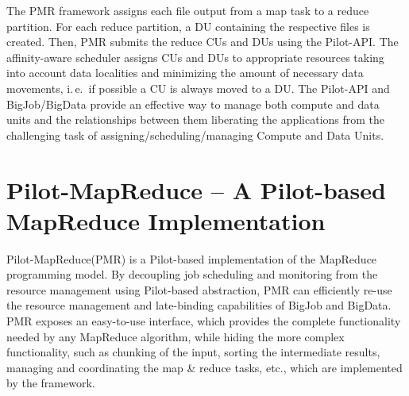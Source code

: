 \documentclass{sig-alternate}
\newcommand{\jhanote}[1]{ {\textcolor{red} { ***SJ: #1 }}}
\newcommand{\alnote}[1]{ {\textcolor{blue} { ***andreL: #1 }}}
\newcommand{\pnote}[1]{ {\textcolor{magenta} { ***pradeep: #1 }}}
\newcommand{\secrev}[1]{ {\textcolor{Bittersweet} { ***reviewer2: #1 }}}
\newcommand{\alnote}[1]{}
\newcommand{\pnote}[1]{}
\newcommand{\jhanote}[1]{}
\newcommand{\upp}{\vspace*{-0.5em}}
\newcommand{\pilot}{Pilot\xspace}
\newcommand{\pilotmapreduce}{Pilot-MapReduce\xspace}
\newcommand{\dataunits}{Data Units\xspace}
\begin{document}
The PMR framework assigns each file output from a map task to a reduce
partition. For each reduce partition, a DU containing the respective
files is created. Then, PMR submits the reduce CUs and DUs using the
Pilot-API. The affinity-aware scheduler assigns CUs and DUs to
appropriate resources taking into account data localities and
minimizing the amount of necessary data movements, i.\,e.\ if possible
a CU is always moved to a DU.  The Pilot-API and BigJob/BigData
provide an effective way to manage both compute and data units and the
relationships between them liberating the applications from the
challenging task of assigning/scheduling/managing Compute and
\dataunits.






\upp
\section{Pilot-MapReduce -- A Pilot-based MapReduce Implementation}
\label{sec-pilot-mr}

  

\pilotmapreduce (PMR) is a \pilot-based implementation of the
MapReduce programming model. 
By decoupling job scheduling and monitoring from the resource management using
\pilot-based abstraction, PMR can efficiently re-use the resource management
and late-binding capabilities of BigJob and BigData. PMR exposes an
easy-to-use interface, which provides the
complete functionality needed by any MapReduce algorithm, while hiding
the more complex functionality, such as chunking of the input, sorting
the intermediate results, managing and coordinating the map \& reduce
tasks, etc., which are implemented by the framework.
\end{document}
